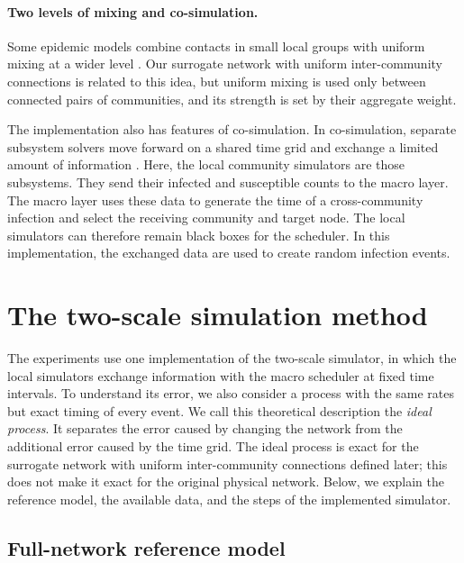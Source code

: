 \documentclass[a4paper,fleqn]{cas-sc}
\begin{document}
\paragraph{Two levels of mixing and co-simulation.}
Some epidemic models combine contacts in small local groups with uniform mixing at a wider level \citep{ball1997}. Our surrogate network with uniform inter-community connections is related to this idea, but uniform mixing is used only between connected pairs of communities, and its strength is set by their aggregate weight.

The implementation also has features of co-simulation. In co-simulation, separate subsystem solvers move forward on a shared time grid and exchange a limited amount of information \citep{gomes2018cosim}. Here, the local community simulators are those subsystems. They send their infected and susceptible counts to the macro layer. The macro layer uses these data to generate the time of a cross-community infection and select the receiving community and target node. The local simulators can therefore remain black boxes for the scheduler. In this implementation, the exchanged data are used to create random infection events.


\section{The two-scale simulation method}
\label{sec:method}

The experiments use one implementation of the two-scale simulator, in which the local simulators exchange information with the macro scheduler at fixed time intervals. To understand its error, we also consider a process with the same rates but exact timing of every event. We call this theoretical description the \emph{ideal process}. It separates the error caused by changing the network from the additional error caused by the time grid. The ideal process is exact for the surrogate network with uniform inter-community connections defined later; this does not make it exact for the original physical network. Below, we explain the reference model, the available data, and the steps of the implemented simulator.

\subsection{Full-network reference model}
\label{sec:reference}
\end{document}
